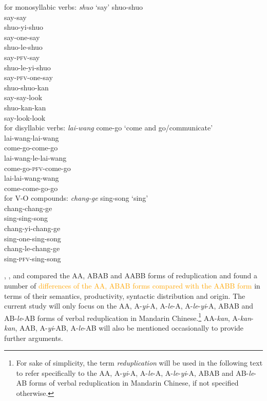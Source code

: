 \documentclass[11pt,a4paper,fleqn,draft]{article}
\newcommand{\changed}[1]{\textcolor{orange}{#1}}
\begin{document}
\ea\label{ex:redup-forms}
	\ea for monosyllabic verbs: \emph{shuo} `say'
		\ea \gll shuo-shuo\\
		say-say\\
		\ex \gll shuo-yi-shuo\\
		say-one-say\\
		\ex \gll shuo-le-shuo\\
		say-\textsc{pfv}-say\\
		\ex \gll shuo-le-yi-shuo\\
		say-\textsc{pfv}-one-say\\
		\ex \gll shuo-shuo-kan\\
		say-say-look\\
		\ex \gll shuo-kan-kan\\
		 say-look-look\\
		\z
	\ex for disyllabic verbs: \emph{lai-wang} come-go `come and go/communicate'\\
		\ea \gll lai-wang-lai-wang\\
		come-go-come-go\\ 
		\ex \gll lai-wang-le-lai-wang\\
		come-go-\textsc{pfv}-come-go\\ 
		\ex \gll lai-lai-wang-wang\\
		come-come-go-go\\ 
		\z
	\ex\label{ex:forms-VO} for V-O compounds: \emph{chang-ge} sing-song `sing'\\
		\ea \gll chang-chang-ge\\
		sing-sing-song\\ 
		\ex \gll chang-yi-chang-ge\\
		sing-one-sing-song\\ 
		\ex \gll chang-le-chang-ge\\
		sing-\textsc{pfv}-sing-song\\ 
		\z
	\z
\z



\citet{Arcodiaetal2014}, \citet{Fan1964}, \citet{MelloniBasciano2018} and \citet{Xie2020} compared the AA, ABAB and AABB forms of reduplication 
and found a number of \changed{differences of the AA, ABAB forms compared with the AABB form} in terms of their semantics, productivity, syntactic distribution and origin. 
The current study will only focus on the AA, A-\emph{yi}-A, A-\emph{le}-A, A-\emph{le}-\emph{yi}-A, ABAB and AB-\emph{le}-AB forms of verbal reduplication in Mandarin Chinese.\footnote{For sake of simplicity, 
the term \emph{reduplication} will be used in the following text to refer specifically to the AA, A-\emph{yi}-A, A-\emph{le}-A, A-\emph{le}-\emph{yi}-A, ABAB and AB-\emph{le}-AB forms of verbal reduplication in Mandarin Chinese, if not specified otherwise.}
AA-\emph{kan}, A-\emph{kan}-\emph{kan}, AAB, A-\emph{yi}-AB, A-\emph{le}-AB will also be mentioned occasionally to provide further arguments.
\end{document}
